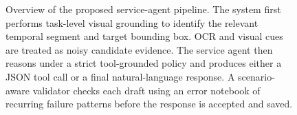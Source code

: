 \begin{figure}[t]
{%
}
\caption{Overview of the proposed service-agent pipeline. The system first performs task-level visual grounding to identify the relevant temporal segment and target bounding box. OCR and visual cues are treated as noisy candidate evidence. The service agent then reasons under a strict tool-grounded policy and produces either a JSON tool call or a final natural-language response. A scenario-aware validator checks each draft using an error notebook of recurring failure patterns before the response is accepted and saved.}
\label{fig:method-pipeline}
\end{figure}
